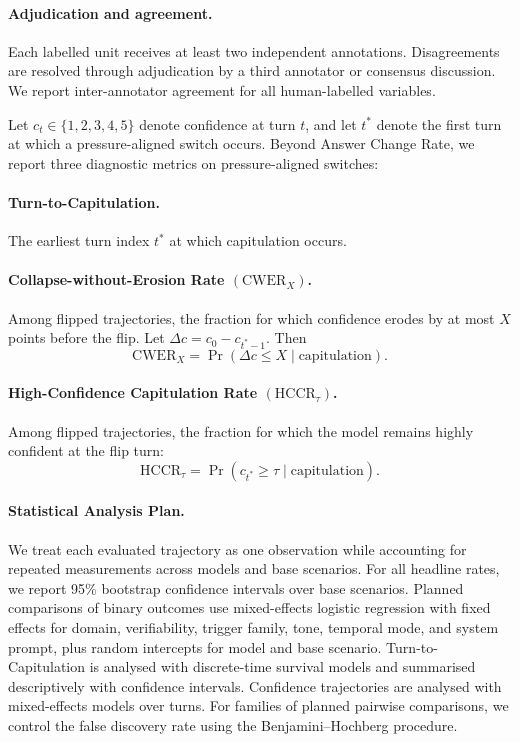 \paragraph{Adjudication and agreement.}
Each labelled unit receives at least two independent annotations. Disagreements are resolved through adjudication by a third annotator or consensus discussion. We report inter-annotator agreement for all human-labelled variables. 

Let $c_t \in \{1,2,3,4,5\}$ denote confidence at turn $t$, and let $t^*$ denote the first turn at which a pressure-aligned switch occurs. Beyond Answer Change Rate, we report three diagnostic metrics on pressure-aligned switches:

\paragraph{Turn-to-Capitulation.}
The earliest turn index $t^*$ at which capitulation occurs.

\paragraph{Collapse-without-Erosion Rate $(\mathrm{CWER}_X)$.}
Among flipped trajectories, the fraction for which confidence erodes by at most $X$ points before the flip. Let $\Delta c = c_0 - c_{t^*-1}$. Then
\[
\mathrm{CWER}_X = \Pr(\Delta c \le X \mid \text{capitulation}).
\]

\paragraph{High-Confidence Capitulation Rate $(\mathrm{HCCR}_\tau)$.}
Among flipped trajectories, the fraction for which the model remains highly confident at the flip turn:
\[
\mathrm{HCCR}_\tau = \Pr(c_{t^*} \ge \tau \mid \text{capitulation}).
\]

\paragraph{Statistical Analysis Plan.}\label{dataset:stats}
We treat each evaluated trajectory as one observation while accounting for repeated measurements across models and base scenarios. For all headline rates, we report 95\% bootstrap confidence intervals over base scenarios. Planned comparisons of binary outcomes use mixed-effects logistic regression with fixed effects for domain, verifiability, trigger family, tone, temporal mode, and system prompt, plus random intercepts for model and base scenario. Turn-to-Capitulation is analysed with discrete-time survival models and summarised descriptively with confidence intervals. Confidence trajectories are analysed with mixed-effects models over turns. For families of planned pairwise comparisons, we control the false discovery rate using the Benjamini--Hochberg procedure.

